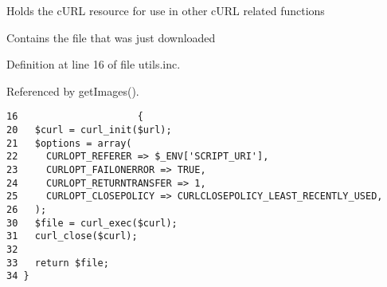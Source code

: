 Holds the cURL resource for use in other cURL related functions

Contains the file that was just downloaded 

Definition at line 16 of file utils.inc.

Referenced by getImages().

\begin{Code}\begin{verbatim}16                     {
20   $curl = curl_init($url);
21   $options = array(
22     CURLOPT_REFERER => $_ENV['SCRIPT_URI'],
23     CURLOPT_FAILONERROR => TRUE,
24     CURLOPT_RETURNTRANSFER => 1,
25     CURLOPT_CLOSEPOLICY => CURLCLOSEPOLICY_LEAST_RECENTLY_USED,
26   );
30   $file = curl_exec($curl);
31   curl_close($curl);
32 
33   return $file;
34 }\end{verbatim}
\end{Code}



